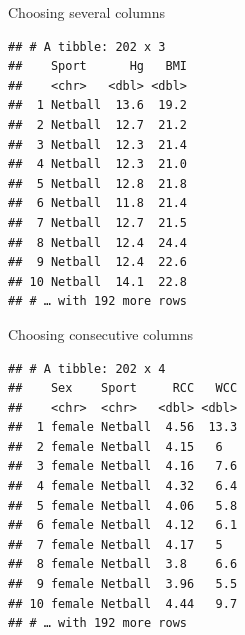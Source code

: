 \documentclass[ignorenonframetext,]{beamer}
\newenvironment{Shaded}{\begin{snugshade}}{\end{snugshade}}
\newcommand{\KeywordTok}[1]{\textcolor[rgb]{0.13,0.29,0.53}{\textbf{#1}}}
\newcommand{\NormalTok}[1]{#1}
\newcommand{\OperatorTok}[1]{\textcolor[rgb]{0.81,0.36,0.00}{\textbf{#1}}}
\newcommand{\StringTok}[1]{\textcolor[rgb]{0.31,0.60,0.02}{#1}}
\begin{document}
\begin{frame}[fragile]{Choosing several columns}
\protect\hypertarget{choosing-several-columns}{}

\begin{Shaded}
\end{Shaded}

\begin{verbatim}
## # A tibble: 202 x 3
##    Sport      Hg   BMI
##    <chr>   <dbl> <dbl>
##  1 Netball  13.6  19.2
##  2 Netball  12.7  21.2
##  3 Netball  12.3  21.4
##  4 Netball  12.3  21.0
##  5 Netball  12.8  21.8
##  6 Netball  11.8  21.4
##  7 Netball  12.7  21.5
##  8 Netball  12.4  24.4
##  9 Netball  12.4  22.6
## 10 Netball  14.1  22.8
## # … with 192 more rows
\end{verbatim}

\end{frame}

\begin{frame}[fragile]{Choosing consecutive columns}
\protect\hypertarget{choosing-consecutive-columns}{}

\begin{Shaded}
\end{Shaded}

\begin{verbatim}
## # A tibble: 202 x 4
##    Sex    Sport     RCC   WCC
##    <chr>  <chr>   <dbl> <dbl>
##  1 female Netball  4.56  13.3
##  2 female Netball  4.15   6  
##  3 female Netball  4.16   7.6
##  4 female Netball  4.32   6.4
##  5 female Netball  4.06   5.8
##  6 female Netball  4.12   6.1
##  7 female Netball  4.17   5  
##  8 female Netball  3.8    6.6
##  9 female Netball  3.96   5.5
## 10 female Netball  4.44   9.7
## # … with 192 more rows
\end{verbatim}

\end{frame}
\end{document}
